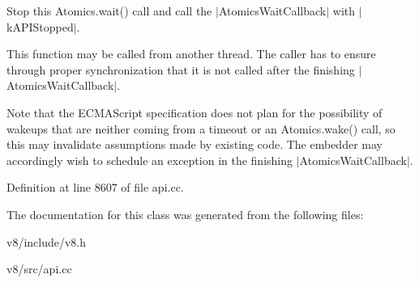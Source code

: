 Stop this {\ttfamily Atomics.\+wait()} call and call the $\vert$\+Atomics\+Wait\+Callback$\vert$ with $\vert$k\+A\+P\+I\+Stopped$\vert$.

This function may be called from another thread. The caller has to ensure through proper synchronization that it is not called after the finishing $\vert$\+Atomics\+Wait\+Callback$\vert$.

Note that the E\+C\+M\+A\+Script specification does not plan for the possibility of wakeups that are neither coming from a timeout or an {\ttfamily Atomics.\+wake()} call, so this may invalidate assumptions made by existing code. The embedder may accordingly wish to schedule an exception in the finishing $\vert$\+Atomics\+Wait\+Callback$\vert$. 

Definition at line 8607 of file api.\+cc.



The documentation for this class was generated from the following files\+:\begin{DoxyCompactItemize}
\item 
v8/include/v8.\+h\item 
v8/src/api.\+cc\end{DoxyCompactItemize}
